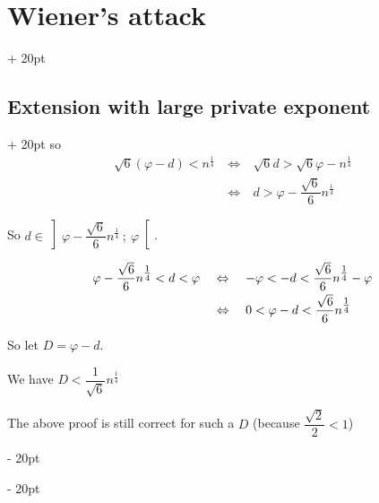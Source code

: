 \documentclass[a4paper, 12pt, twoside]{article}
\newcommand{\ssi}{\ \Leftrightarrow \ }
\newcommand{\ind}[1][20pt]{\advance\leftskip + #1}
\newcommand{\deind}[1][20pt]{\advance\leftskip - #1}
\newenvironment{indt}[2][20pt]{#2 \par \ind[#1]}{\par \deind} %
\begin{document}
\begin{indt}{\section{Wiener's attack}}
\begin{indt}{\subsection{Extension with large private exponent}}
            so
            \[
                \begin{array}{rcl}
                    \sqrt 6 (\varphi - d) < n^{\tfrac 1 4}
                    &\ssi& \sqrt 6 d > \sqrt 6 \varphi - n^{\tfrac 1 4}
                    \\
                    &\ssi& d > \varphi - \dfrac{\sqrt 6}{6} n^{\tfrac 1 4}
                \end{array}
            \]

            So $d \in \left] \varphi - \dfrac{\sqrt 6}{6}n^{\tfrac 1 4}\ ;\ \varphi \right[$.

            \[
                \begin{array}{rcl}
                    \varphi - \dfrac{\sqrt 6} 6 n^{\tfrac 1 4} < d < \varphi
                    &\ssi& -\varphi < -d < \dfrac{\sqrt 6}{6}n^{\tfrac 1 4} - \varphi
                    \vspace{3pt}
                    \\
                    &\ssi& 0 < \varphi - d < \dfrac{\sqrt{6}}{6} n^{\tfrac 1 4}
                \end{array}
            \]

            So let $D = \varphi - d$.

            We have $D < \dfrac{1}{\sqrt 6} n^{\tfrac 1 4}$

            The above proof is still correct for such a $D$ (because $\dfrac{\sqrt 2} 2 < 1$)
        \end{indt}
    \end{indt}
    
    
    
\end{document}

